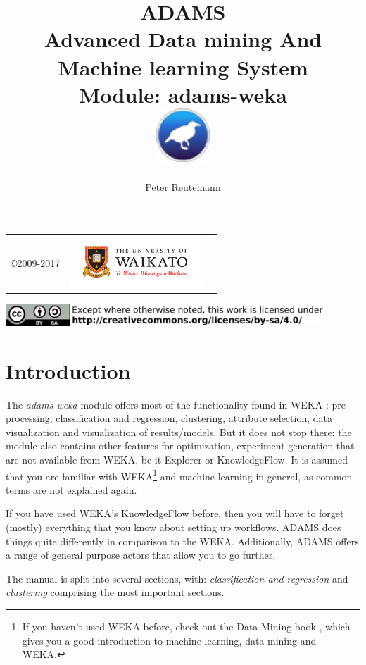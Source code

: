\documentclass[a4paper]{book}
\title{
  \textbf{ADAMS} \\
  {\Large \textbf{A}dvanced \textbf{D}ata mining \textbf{A}nd \textbf{M}achine
  learning \textbf{S}ystem} \\
  {\Large Module: adams-weka} \\
  \vspace{1cm}
  \includegraphics[width=2cm]{images/weka-module.png} \\
}
\author{
  Peter Reutemann
}
\begin{document}
\begin{titlepage}
\maketitle

\thispagestyle{empty}
\center
\begin{table}[b]
	\begin{tabular}{c l l}
		\parbox[c][2cm]{2cm}{\copyright 2009-2017} &
		\parbox[c][2cm]{5cm}{\includegraphics[width=5cm]{images/coat_of_arms.pdf}} \\
	\end{tabular}
	\includegraphics[width=12cm]{images/cc.png} \\
\end{table}

\end{titlepage}

\tableofcontents
\listoffigures

\chapter{Introduction}
The \textit{adams-weka} module offers most of the functionality found in WEKA
\cite{weka}: pre-processing, classification and regression, clustering,
attribute selection, data visualization and visualization of results/models.
But it does not stop there: the module also contains other features for
optimization, experiment generation that are not available from WEKA, be it
Explorer or KnowledgeFlow. It is assumed that you are familiar with
WEKA\footnote{If you haven't used WEKA before, check out the Data Mining book
\cite{wekabook}, which gives you a good introduction to machine learning, data
mining and WEKA.} and machine learning in general, as common terms are not
explained again.

If you have used WEKA's KnowledgeFlow before, then you will have to forget
(mostly) everything that you know about setting up workflows. ADAMS does things
quite differently in comparison to the WEKA. Additionally, ADAMS offers a range
of general purpose actors that allow you to go further.

The manual is split into several sections, with: \textit{classification and regression}
and \textit{clustering} comprising the most important sections.
















\end{document}
